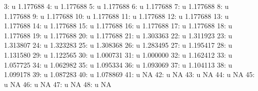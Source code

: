 \documentclass[nojss]{jss}
\begin{document}
\begin{Schunk}
\begin{Soutput}
  3:                               u            1.177688
  4:                               u            1.177688
  5:                               u            1.177688
  6:                               u            1.177688
  7:                               u            1.177688
  8:                               u            1.177688
  9:                               u            1.177688
 10:                               u            1.177688
 11:                               u            1.177688
 12:                               u            1.177688
 13:                               u            1.177688
 14:                               u            1.177688
 15:                               u            1.177688
 16:                               u            1.177688
 17:                               u            1.177688
 18:                               u            1.177688
 19:                               u            1.177688
 20:                               u            1.177688
 21:                               u            1.303363
 22:                               u            1.311923
 23:                               u            1.313807
 24:                               u            1.323283
 25:                               u            1.308368
 26:                               u            1.283495
 27:                               u            1.195417
 28:                               u            1.131580
 29:                               u            1.122565
 30:                               u            1.000731
 31:                               u            1.000000
 32:                               u            1.162412
 33:                               u            1.057725
 34:                               u            1.062982
 35:                               u            1.095334
 36:                               u            1.093069
 37:                               u            1.104113
 38:                               u            1.099178
 39:                               u            1.087283
 40:                               u            1.078869
 41:                               u                  NA
 42:                               u                  NA
 43:                               u                  NA
 44:                               u                  NA
 45:                               u                  NA
 46:                               u                  NA
 47:                               u                  NA
 48:                               u                  NA

\end{Soutput}
\end{Schunk}
\end{document}
